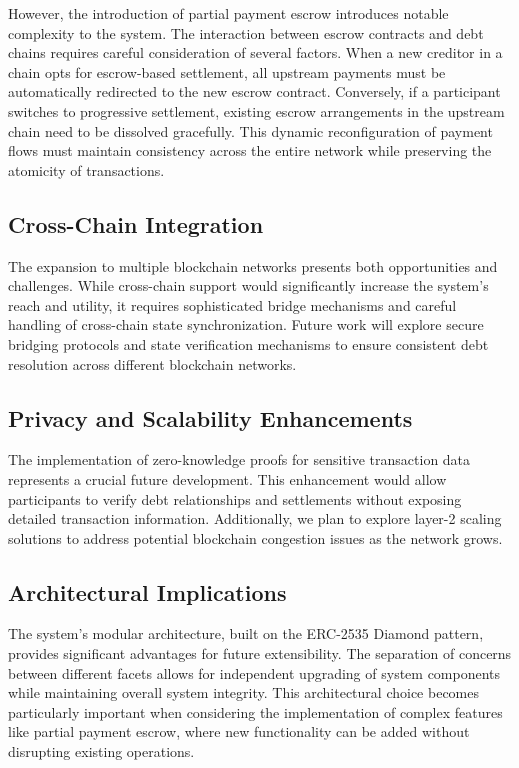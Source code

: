 \documentclass[twocolumn,10pt,a4paper]{article}
\begin{document}
However, the introduction of partial payment escrow introduces notable complexity to the system. The interaction between escrow contracts and debt chains requires careful consideration of several factors. When a new creditor in a chain opts for escrow-based settlement, all upstream payments must be automatically redirected to the new escrow contract. Conversely, if a participant switches to progressive settlement, existing escrow arrangements in the upstream chain need to be dissolved gracefully. This dynamic reconfiguration of payment flows must maintain consistency across the entire network while preserving the atomicity of transactions.

\subsection{Cross-Chain Integration}
The expansion to multiple blockchain networks presents both opportunities and challenges. While cross-chain support would significantly increase the system's reach and utility, it requires sophisticated bridge mechanisms and careful handling of cross-chain state synchronization. Future work will explore secure bridging protocols and state verification mechanisms to ensure consistent debt resolution across different blockchain networks.

\subsection{Privacy and Scalability Enhancements}
The implementation of zero-knowledge proofs for sensitive transaction data represents a crucial future development. This enhancement would allow participants to verify debt relationships and settlements without exposing detailed transaction information. Additionally, we plan to explore layer-2 scaling solutions to address potential blockchain congestion issues as the network grows.

\subsection{Architectural Implications}
The system's modular architecture, built on the ERC-2535 Diamond pattern, provides significant advantages for future extensibility. The separation of concerns between different facets allows for independent upgrading of system components while maintaining overall system integrity. This architectural choice becomes particularly important when considering the implementation of complex features like partial payment escrow, where new functionality can be added without disrupting existing operations.
\end{document}
